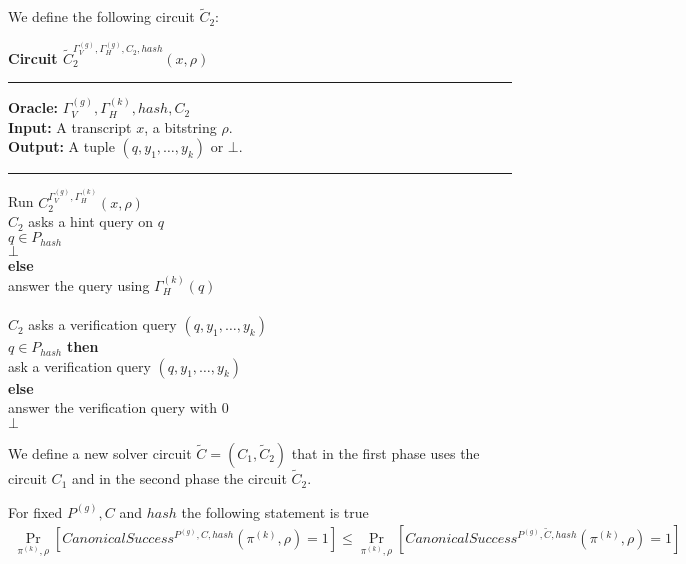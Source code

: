 %
\newcommand{\prGx}{(\Gamma_V,\Gamma_H) := \langle P^{(1)}(\pi^*), D_1(\rho) \rangle_{P^{(1)}} \\ x^* := \langle P^{(1)}(\pi^*), D_1(\rho) \rangle_{\text{trans}}}
%
We define the following circuit $\widetilde{C}_2$:
\begin{codeblock}
  \textbf{Circuit $\widetilde{C}_2^{\Gamma_V^{(g)}, \Gamma_H^{(g)}, C_2, hash} (x, \rho)$}
  \medskip \hrule \medskip
  \textbf{Oracle:} $\Gamma_V^{(g)}, \Gamma_H^{(k)}, hash, C_2$ \\
  \textbf{Input:} A transcript $x$, a bitstring $\rho$. \\
  \textbf{Output:} A tuple $(q, y_1, \dots, y_k)$ or $\bot$.
  \medskip\hrule\medskip
  Run $C_2^{\Gamma_V^{(g)},\Gamma_H^{(k)}}(x, \rho)$ \\
  \IndI \If $C_2$ asks a hint query on $q$ \then\\
  \IndII \If $q \in P_{hash}$ \then\\
  \IndIII \return $\bot$\\
  \IndII \textbf{else}\\
  \IndIII answer the query using $\Gamma_H^{(k)}(q)$\\
  \\
  \IndI \If $C_2$ asks a verification query $(q, y_1, \dots, y_k)$ \then \\
  \IndII \If $q \in P_{hash}$ \textbf{then} \\
  \IndIII ask a verification query $(q, y_1, \dots, y_k)$ \\
  \IndII \textbf{else} \\
  \IndIII answer the verification query with 0 \\
  \return $\bot$
\end{codeblock}
%
We define a new solver circuit $\widetilde{C} = (C_1, \widetilde{C}_2)$
that in the first phase uses the circuit $C_1$ and in the second phase the circuit $\widetilde{C}_2$.
%
\begin{lemma}
  \label{lemma:ctilda_c}
  For fixed $P^{(g)}, C$ and $hash$ the following statement is true
  \begin{align*}
    \underset{\pi^{(k)}, \rho}{\Pr}[CanonicalSuccess^{P^{(g)}, C, hash}(\pi^{(k)}, \rho) = 1]
    \leq \underset{\pi^{(k)}, \rho}{\Pr}[CanonicalSuccess^{P^{(g)}, \widetilde{C}, hash}(\pi^{(k)}, \rho) = 1]
  \end{align*}
\end{lemma}
